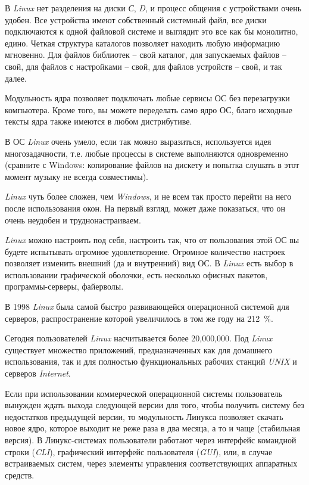 В \textit{Linux} нет разделения на диски \textit{С}, \textit{D}, и процесс общения с устройствами очень удобен. Все устройства имеют собственный системный файл, все диски подключаются к одной файловой системе и выглядит это все как бы монолитно, едино. Четкая структура каталогов позволяет находить любую информацию мгновенно. Для файлов библиотек – свой каталог, для запускаемых файлов – свой, для файлов с настройками – свой, для файлов устройств – свой, и так далее.

Модульность ядра позволяет подключать любые сервисы ОС без перезагрузки компьютера. Кроме того, вы можете переделать само ядро ОС, благо исходные тексты ядра также имеются в любом дистрибутиве.

В ОС \textit{Linux} очень умело, если так можно выразиться, используется идея многозадачности, т.е. любые процессы в системе выполняются одновременно (сравните с Windows: копирование файлов на дискету и попытка слушать в этот момент музыку не всегда совместимы).

\textit{Linux} чуть более сложен, чем \textit{Windows}, и не всем так просто перейти на него после использования окон. На первый взгляд, может даже показаться, что он очень неудобен и труднонастраиваем.

\textit{Linux} можно настроить под себя, настроить так, что от пользования этой ОС вы будете испытывать огромное удовлетворение. Огромное количество настроек позволяет изменить внешний (да и внутренний) вид ОС. В \textit{Linux} есть выбор в использовании графической оболочки, есть несколько офисных пакетов, программы-серверы, файерволы.

В 1998 \textit{Linux} была самой быстро развивающейся операционной системой для серверов, распространение которой увеличилось в том же году на 212~\%.

Сегодня пользователей \textit{Linux} насчитывается более 20,000,000. Под \textit{Linux} существует множество приложений, предназначенных как для домашнего использования, так и для полностью функциональных рабочих станций \textit{UNIX} и серверов \textit{Internet}.

Если при использовании коммерческой операционной системы пользователь вынужден ждать выхода следующей версии для того, чтобы получить систему без недостатков предыдущей версии, то модульность Линукса позволяет скачать новое ядро, которое выходит не реже раза в два месяца, а то и чаще (стабильная версия). В Линукс-системах пользователи работают через интерфейс командной строки (\textit{CLI}), графический интерфейс пользователя (\textit{GUI}), или, в случае встраиваемых систем, через элементы управления соответствующих аппаратных средств.

